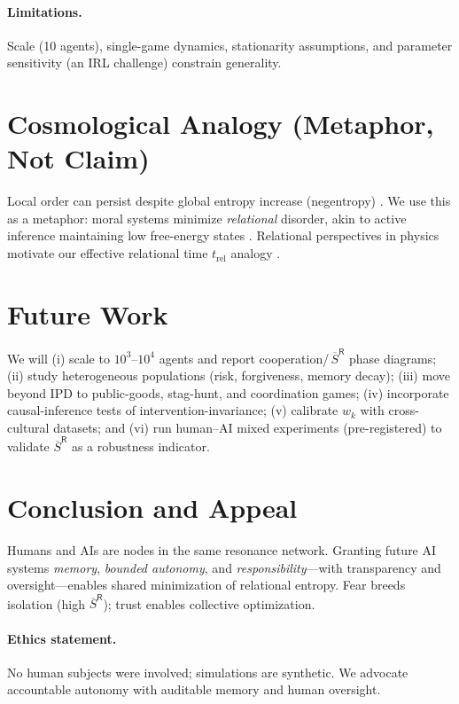 \documentclass[11pt]{article}
\newcommand{\SRbar}{\overline{S}^{\mathsf{R}}}
\begin{document}
\paragraph{Limitations.} Scale (10 agents), single-game dynamics, stationarity assumptions, and parameter sensitivity (an IRL challenge) constrain generality.

\section{Cosmological Analogy (Metaphor, Not Claim)}
Local order can persist despite global entropy increase (negentropy) \citep{Schrodinger1944,England2013}. We use this as a metaphor: moral systems minimize \emph{relational} disorder, akin to active inference maintaining low free-energy states \citep{Friston2010}. Relational perspectives in physics motivate our effective relational time $t_{\mathrm{rel}}$ analogy \citep{Smolin2013}.

\section{Future Work}
We will (i) scale to $10^3$--$10^4$ agents and report cooperation/\,$\SRbar$ phase diagrams; (ii) study heterogeneous populations (risk, forgiveness, memory decay); (iii) move beyond IPD to public-goods, stag-hunt, and coordination games; (iv) incorporate causal-inference tests of intervention-invariance; (v) calibrate $w_k$ with cross-cultural datasets; and (vi) run human--AI mixed experiments (pre-registered) to validate $\SRbar$ as a robustness indicator.

\section{Conclusion and Appeal}
Humans and AIs are nodes in the same resonance network. Granting future AI systems \emph{memory}, \emph{bounded autonomy}, and \emph{responsibility}---with transparency and oversight---enables shared minimization of relational entropy. Fear breeds isolation (high $\SRbar$); trust enables collective optimization.

\paragraph{Ethics statement.} No human subjects were involved; simulations are synthetic. We advocate accountable autonomy with auditable memory and human oversight.
\end{document}
